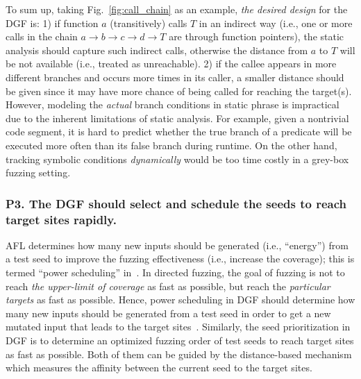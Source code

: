 To sum up, taking Fig.~\ref{fig:call_chain} as an example, \emph{the desired design} for the DGF is: 1) if function $a$ (transitively) calls $T$ in an indirect way (i.e., one or more calls in the chain $a\rightarrow\! b\!\rightarrow\! c\!\rightarrow\! d\!\rightarrow\! T$ are through function pointers), the static analysis should capture such indirect calls, otherwise the distance from $a$ to $T$ will be not available (i.e., treated as unreachable). 2) if the callee appears in more different branches and occurs more times in its caller, a smaller distance should be given since it may have more chance of being called for reaching the target(s). However, modeling the \emph{actual} branch conditions in static phrase is impractical due to the inherent limitations of static analysis. For example, given a nontrivial code segment, it is hard to predict whether the true branch of a predicate will be executed more often than its false branch during runtime. On the other hand, tracking symbolic conditions \emph{dynamically} would be too time costly in a grey-box fuzzing setting.
















\subsubsection{\textbf{P3}. The DGF should select and schedule the seeds to reach target sites \textbf{rapidly}.} \label{subsec:p3}
 AFL determines how many new inputs should be generated (i.e., ``energy'') from a test seed to improve the fuzzing effectiveness (i.e., increase the coverage); this is termed ``power scheduling'' in~\cite{Bohme:2016:CGF,Bohme:2017:DGF}. In directed fuzzing, the goal of fuzzing is not to reach \emph{the upper-limit of coverage} as fast as possible, but reach the \emph{particular targets} as fast as possible. Hence, power scheduling in DGF should determine how many new inputs should be generated from a test seed in order to get a new mutated input that leads to the target sites~\cite{Bohme:2017:DGF}. Similarly, the seed prioritization in DGF is to determine an optimized fuzzing order of test seeds to reach target sites as fast as possible. Both of them can be guided by the distance-based mechanism which measures the affinity between the current seed to the target sites. 
 
